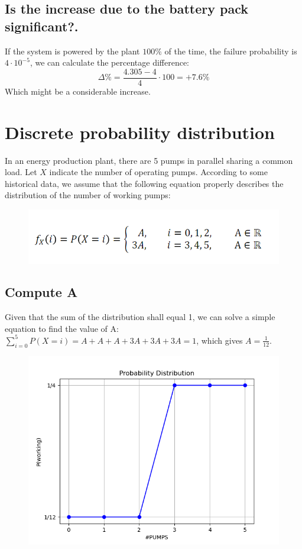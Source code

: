 \documentclass{article}
\begin{document}
\subsection{Is the increase due to the battery pack significant?.}
If the system is powered by the plant $100\%$ of the time, the failure probability is $4 \cdot 10^{-5}$, we can calculate the percentage difference:
\begin{equation}
    \Delta \% = \frac{4.305-4}{4} \cdot 100 = +7.6 \%
\end{equation}
Which might be a considerable increase.


\newpage
\section{Discrete probability distribution}
In an energy production plant, there are 5 pumps in parallel sharing a common
load. Let $X$ indicate the number of operating pumps. According to some
historical data, we assume that the following equation properly describes the
distribution of the number of working pumps:

\begin{figure}[h]
    \centering
    \centerline{\includegraphics[scale=0.4]{Untitled.png}}
\end{figure}



\subsection{Compute A}
Given that the sum of the distribution shall equal 1, we can solve a simple equation to find the value of A: $\sum_{i=0}^{5} P(X=i) = A+A+A+3A+3A+3A = 1$, which gives $A = \frac{1}{12}$.

\begin{figure}[h]
    \centering
    \includegraphics[width=0.5\linewidth]{Figure_3.png}
   
\end{figure}
\end{document}
